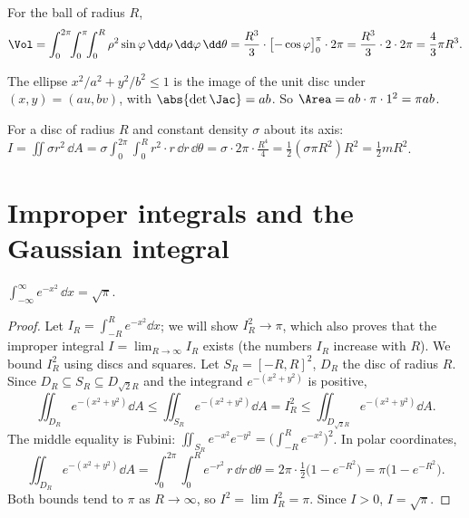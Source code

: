 \begin{example}
For the ball of radius $R$,
\[
\Vol=\int_0^{2\pi}\!\!\int_0^\pi\!\!\int_0^R\rho^2\sin\varphi\,\dd\rho\,\dd\varphi\,\dd\theta=\frac{R^3}3\cdot\bigl[-\cos\varphi\bigr]_0^\pi\cdot2\pi=\frac{R^3}3\cdot2\cdot2\pi=\frac43\pi R^3 .
\]
\end{example}

\begin{example}
The ellipse $x^2/a^2+y^2/b^2\le1$ is the image of the unit disc under $(x,y)=(au,bv)$, with $\abs{\det\Jac}=ab$. So $\Area=ab\cdot\pi\cdot1^2=\pi ab$.
\end{example}

\begin{example}
For a disc of radius $R$ and constant density $\sigma$ about its axis: $I=\iint\sigma r^2\,\dd A=\sigma\int_0^{2\pi}\!\!\int_0^Rr^2\cdot r\,\dd r\,\dd\theta=\sigma\cdot2\pi\cdot\frac{R^4}4=\frac12(\sigma\pi R^2)R^2=\frac12mR^2$.
\end{example}

\section{Improper integrals and the Gaussian integral}

\begin{theorem}\label{thm:gaussint}
$\displaystyle\int_{-\infty}^\infty e^{-x^2}\,\dd x=\sqrt\pi$.
\end{theorem}

\begin{proof}
Let $I_R=\int_{-R}^Re^{-x^2}\dd x$; we will show $I_R^2\to\pi$, which also proves that the improper integral $I=\lim_{R\to\infty}I_R$ exists (the numbers $I_R$ increase with $R$). We bound $I_R^2$ using discs and squares. Let $S_R=[-R,R]^2$, $D_R$ the disc of radius $R$. Since $D_R\subseteq S_R\subseteq D_{\sqrt2R}$ and the integrand $e^{-(x^2+y^2)}$ is positive,
\[
\iint_{D_R}e^{-(x^2+y^2)}\dd A\le\iint_{S_R}e^{-(x^2+y^2)}\dd A=I_R^2\le\iint_{D_{\sqrt2R}}e^{-(x^2+y^2)}\dd A .
\]
The middle equality is Fubini: $\iint_{S_R}e^{-x^2}e^{-y^2}=\bigl(\int_{-R}^Re^{-x^2}\bigr)^2$. In polar coordinates,
\[
\iint_{D_R}e^{-(x^2+y^2)}\dd A=\int_0^{2\pi}\!\!\int_0^Re^{-r^2}\,r\,\dd r\,\dd\theta=2\pi\cdot\tfrac12\bigl(1-e^{-R^2}\bigr)=\pi\bigl(1-e^{-R^2}\bigr).
\]
Both bounds tend to $\pi$ as $R\to\infty$, so $I^2=\lim I_R^2=\pi$. Since $I>0$, $I=\sqrt\pi$.
\end{proof}

